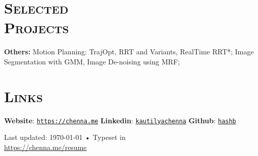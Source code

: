 \documentclass[margin, line]{resume}
\begin{document}
\begin{resume}

    \sectionline
    \section{\mysidestyle \textsc{Selected \\ Projects}}

    \textbf{Others:} Motion Planning: TrajOpt, RRT and Variants, RealTime RRT*; Image Segmentation with GMM, Image De-noising using MRF;


%
%



    \sectionline
    \section{\mysidestyle \textsc{Links}}
    \textbf{Website}: \texttt{\href{https://chenna.me}{https://chenna.me}} \hspace{2mm}%
    \textbf{Linkedin}: \texttt{\href{https://www.linkedin.com/in/kautilyachenna/}{kautilyachenna}} \hspace{2mm}%
    \textbf{Github}: \texttt{\href{https://github.com/hashb}{hashb}}
    \vspace{-3.2mm}

\begin{center}
    {\scriptsize  Last updated: \today\- •\- Typeset in {\XeTeX }\\
        \href{https://chenna.me/resume}{https://chenna.me/resume}}
\end{center}

\end{resume}
\end{document}
